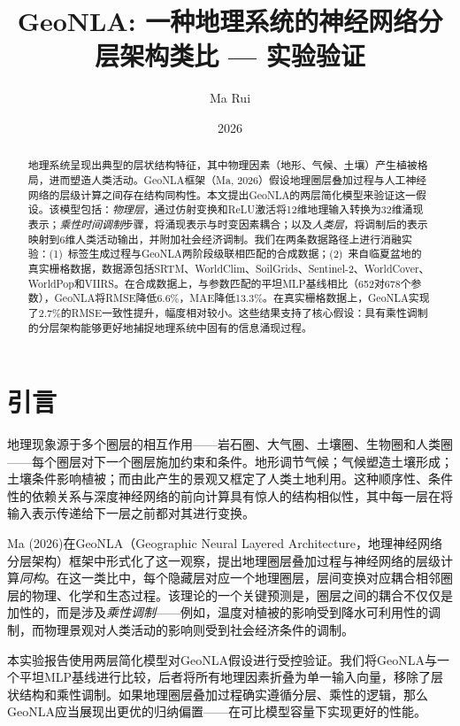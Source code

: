 \documentclass[a4paper,11pt]{article}
\title{\textbf{GeoNLA: 一种地理系统的神经网络分层架构类比 --- 实验验证}}
\author{Ma Rui}
\date{2026}
\begin{document}
\maketitle

\begin{abstract}
地理系统呈现出典型的层状结构特征，其中物理因素（地形、气候、土壤）产生植被格局，进而塑造人类活动。GeoNLA框架（Ma, 2026）假设地理圈层叠加过程与人工神经网络的层级计算之间存在结构同构性。本文提出GeoNLA的两层简化模型来验证这一假设。该模型包括：\emph{物理层}，通过仿射变换和ReLU激活将12维地理输入转换为32维涌现表示；\emph{乘性时间调制}步骤，将涌现表示与时变因素耦合；以及\emph{人类层}，将调制后的表示映射到6维人类活动输出，并附加社会经济调制。我们在两条数据路径上进行消融实验：(1)~标签生成过程与GeoNLA两阶段级联相匹配的合成数据；(2)~来自临夏盆地的真实栅格数据，数据源包括SRTM、WorldClim、SoilGrids、Sentinel-2、WorldCover、WorldPop和VIIRS。在合成数据上，与参数匹配的平坦MLP基线相比（652对678个参数），GeoNLA将RMSE降低6.6\%，MAE降低13.3\%。在真实栅格数据上，GeoNLA实现了2.7\%的RMSE一致性提升，幅度相对较小。这些结果支持了核心假设：具有乘性调制的分层架构能够更好地捕捉地理系统中固有的信息涌现过程。
\end{abstract}

\section{引言}
\label{sec:introduction}

地理现象源于多个圈层的相互作用——岩石圈、大气圈、土壤圈、生物圈和人类圈——每个圈层对下一个圈层施加约束和条件。地形调节气候；气候塑造土壤形成；土壤条件影响植被；而由此产生的景观又框定了人类土地利用。这种顺序性、条件性的依赖关系与深度神经网络的前向计算具有惊人的结构相似性，其中每一层在将输入表示传递给下一层之前都对其进行变换。

Ma (2026)在GeoNLA（Geographic Neural Layered Architecture，地理神经网络分层架构）框架中形式化了这一观察，提出地理圈层叠加过程与神经网络的层级计算\emph{同构}。在这一类比中，每个隐藏层对应一个地理圈层，层间变换对应耦合相邻圈层的物理、化学和生态过程。该理论的一个关键预测是，圈层之间的耦合不仅仅是加性的，而是涉及\emph{乘性调制}——例如，温度对植被的影响受到降水可利用性的调制，而物理景观对人类活动的影响则受到社会经济条件的调制。

本实验报告使用两层简化模型对GeoNLA假设进行受控验证。我们将GeoNLA与一个平坦MLP基线进行比较，后者将所有地理因素折叠为单一输入向量，移除了层状结构和乘性调制。如果地理圈层叠加过程确实遵循分层、乘性的逻辑，那么GeoNLA应当展现出更优的归纳偏置——在可比模型容量下实现更好的性能。
\end{document}
